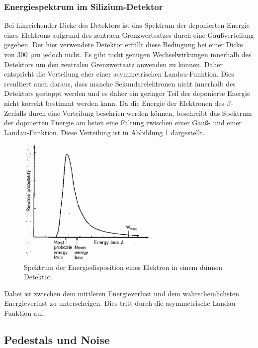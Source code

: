 \subsubsection{Energiespektrum im Silizium-Detektor}
Bei hinreichender Dicke des Detektors ist das Spektrum der deponierten Energie eines
Elektrons aufgrund des zentraen Grenzwertsatzes durch eine Gaußverteilung gegeben.
Der hier verwendete Detektor erfüllt diese Bedingung bei einer Dicke von
\SI{300}{\micro\meter} jedoch nicht.  Es gibt nicht genügen Wechselwirkungen
innerhalb des Detektors
um den zentralen Grenzwertsatz anwenden zu können. Daher entspricht die Verteilung
eher einer asymmetrischen Landau-Funktion. Dies resultiert auch daraus, dass manche
Sekundarelektronen nicht innerhalb des Detektors gestoppt werden und es daher
ein geringer Teil der deponierte Energie nicht korrekt bestimmt werden kann.
Da die Energie der Elektronen des $\beta$-Zerfalls durch eine Verteilung beschrien
werden können, beschreibt das Spektrum der dopnierten Energie am bsten eine Faltung zwischen
einer Gauß- und einer Landau-Funktion. Diese Verteilung ist in Abbildung \ref{fig:faltung}
dargestellt.
\begin{figure}[htb]
  \centering
  \includegraphics[width=0.6\textwidth]{images/Landau.png}
  \caption{Spektrum der Energiedisposition eines Elektron in einem dünnen Detektor. \cite{anleitung}}
  \label{fig:faltung}
\end{figure}
\FloatBarrier
Dabei ist zwischen dem mittleren Energieverlust und dem wahrscheinlichsten Energieverlust
zu unterscheigen. Dies tritt durch die asymmetrische Landau-Funktion auf.


\subsection{Pedestals und Noise}
\label{sec:Theorie_Noise}

